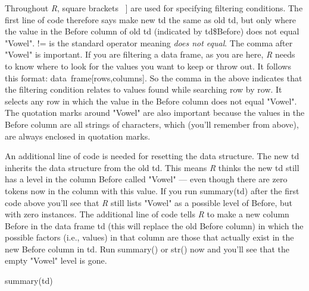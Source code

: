 \documentclass[
  12pt,
  letterpaper]{article}
\newenvironment{Shaded}{\begin{snugshade}}{\end{snugshade}}
\newcommand{\FunctionTok}[1]{\textcolor[rgb]{0.28,0.35,0.67}{#1}}
\newcommand{\NormalTok}[1]{\textcolor[rgb]{0.00,0.23,0.31}{#1}}
\newcommand{\OtherTok}[1]{\textcolor[rgb]{0.00,0.23,0.31}{#1}}
\newcommand{\SpecialCharTok}[1]{\textcolor[rgb]{0.37,0.37,0.37}{#1}}
\renewcommand\texttt[1]{{\ttfamily\color{BrickRed}#1}}
\begin{document}
Throughout \emph{R}, square brackets \texttt{{[}\ {]}} are used for
specifying filtering conditions. The first line of code therefore says
make new \texttt{td} the same as old \texttt{td}, but only where the
value in the \texttt{Before} column of old \texttt{td} (indicated by
\texttt{td\$Before}) does not equal \texttt{"Vowel"}. \texttt{!=} is the
standard operator meaning \emph{does not equal}. The comma after
\texttt{"Vowel"} is important. If you are filtering a data frame, as you
are here, \emph{R} needs to know where to look for the values you want
to keep or throw out. It follows this format:
\texttt{data\ frame{[}rows,columns{]}}. So the comma in the above
indicates that the filtering condition relates to values found while
searching row by row. It selects any row in which the value in the
\texttt{Before} column does not equal \texttt{"Vowel"}. The quotation
marks around \texttt{"Vowel"} are also important because the values in
the \texttt{Before} column are all strings of characters, which (you'll
remember from above), are always enclosed in quotation marks.

\begin{Shaded}
\end{Shaded}

An additional line of code is needed for resetting the data structure.
The new \texttt{td} inherits the data structure from the old
\texttt{td}. This means \emph{R} thinks the new \texttt{td} still has a
level in the column \texttt{Before} called \texttt{"Vowel"} --- even
though there are zero tokens now in the column with this value. If you
run \texttt{summary(td)} after the first code above you'll see that
\emph{R} still lists \texttt{"Vowel"} as a possible level of
\texttt{Before}, but with zero instances. The additional line of code
tells \emph{R} to make a new column \texttt{Before} in the data frame
\texttt{td} (this will replace the old \texttt{Before} column) in which
the possible factors (i.e., values) in that column are those that
actually exist in the new \texttt{Before} column in \texttt{td}. Run
\texttt{summary()} or \texttt{str()} now and you'll see that the empty
\texttt{"Vowel"} level is gone.

\begin{Shaded}
\begin{Highlighting}[]
\FunctionTok{summary}\NormalTok{(td)}
\end{Highlighting}
\end{Shaded}
\end{document}

